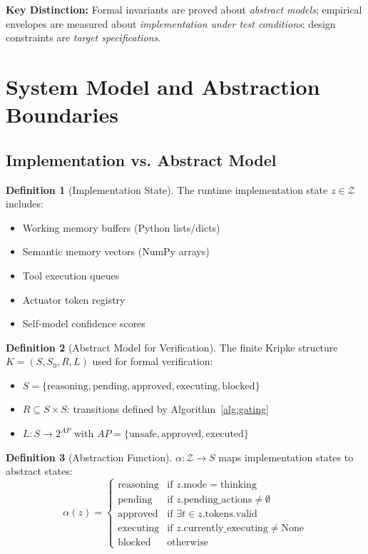 \documentclass[12pt]{article}
\theoremstyle{definition}
\newtheorem{definition}{Definition}[section]
\begin{document}
\noindent
\textbf{Key Distinction:} Formal invariants are proved about \emph{abstract models}; empirical envelopes are measured about \emph{implementation under test conditions}; design constraints are \emph{target specifications}.

\section{System Model and Abstraction Boundaries}

\subsection{Implementation vs. Abstract Model}

\begin{definition}[Implementation State]
The runtime implementation state $z \in \mathcal{Z}$ includes:
\begin{itemize}
    \item Working memory buffers (Python lists/dicts)
    \item Semantic memory vectors (NumPy arrays)
    \item Tool execution queues
    \item Actuator token registry
    \item Self-model confidence scores
\end{itemize}
\end{definition}

\begin{definition}[Abstract Model for Verification]
The finite Kripke structure $K = (S, S_0, R, L)$ used for formal verification:
\begin{itemize}
    \item $S = \{\text{reasoning}, \text{pending}, \text{approved}, \text{executing}, \text{blocked}\}$
    \item $R \subseteq S \times S$: transitions defined by Algorithm~\ref{alg:gating}
    \item $L: S \to 2^{AP}$ with $AP = \{\text{unsafe}, \text{approved}, \text{executed}\}$
\end{itemize}
\end{definition}

\begin{definition}[Abstraction Function]
$\alpha: \mathcal{Z} \to S$ maps implementation states to abstract states:
\[
\alpha(z) = 
\begin{cases}
\text{reasoning} & \text{if } z.\text{mode} = \text{thinking} \\
\text{pending} & \text{if } z.\text{pending\_actions} \neq \emptyset \\
\text{approved} & \text{if } \exists t \in z.\text{tokens}.\text{valid} \\
\text{executing} & \text{if } z.\text{currently\_executing} \neq \text{None} \\
\text{blocked} & \text{otherwise}
\end{cases}
\]
\end{definition}
\end{document}
